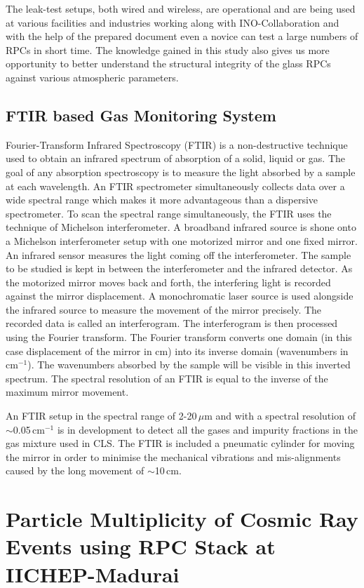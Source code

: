 \documentclass[a4paper,12pt,twoside]{article}
\begin{document}
The leak-test setups, both wired and wireless, are operational and are being used at various facilities and industries working along with INO-Collaboration and with the help of the prepared document even a novice can test a large numbers of RPCs in short time. The knowledge gained in this study also gives us more opportunity to better understand the structural integrity of the glass RPCs against various atmospheric parameters.

\subsection{FTIR based Gas Monitoring System}
Fourier-Transform Infrared Spectroscopy (FTIR) is a non-destructive technique used to obtain an infrared spectrum of absorption of a solid, liquid or gas. The goal of any absorption spectroscopy is to measure the light absorbed by a sample at each wavelength. An FTIR spectrometer simultaneously collects data over a wide spectral range which makes it more advantageous than a dispersive spectrometer. To scan the spectral range simultaneously, the FTIR uses the technique of Michelson interferometer. A broadband infrared source is shone onto a Michelson interferometer setup with one motorized mirror and one fixed mirror. An infrared sensor measures the light coming off the interferometer. The sample to be studied is kept in between the interferometer and the infrared detector. As the motorized mirror moves back and forth, the interfering light is recorded against the mirror displacement. A monochromatic laser source is used alongside the infrared source to measure the movement of the mirror precisely. The recorded data is called an interferogram. The interferogram is then processed using the Fourier transform. The Fourier transform converts one domain (in this case displacement of the mirror in cm) into its inverse domain (wavenumbers in cm$^{-1}$). The wavenumbers absorbed by the sample will be visible in this inverted spectrum. The spectral resolution of an FTIR is equal to the inverse of the maximum mirror movement.

An FTIR setup in the spectral range of \mbox{2-20\,$\mu$m} and with a spectral resolution of \mbox{$\sim$0.05\,cm$^{-1}$} is in development to detect all the gases and impurity fractions in the gas mixture used in CLS. The FTIR is included a pneumatic cylinder for moving the mirror in order to minimise the mechanical vibrations and mis-alignments caused by the long movement of $\sim$10\,cm.

\section{Particle Multiplicity of Cosmic Ray Events using RPC Stack at IICHEP-Madurai}
\end{document}
